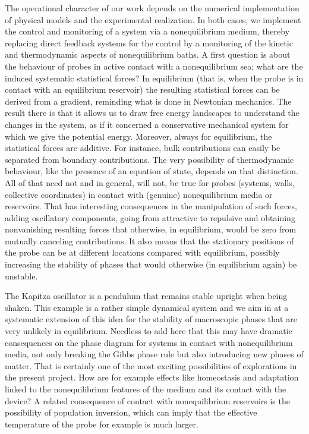 The operational character of our work depends on the numerical implementation of physical
models and the experimental realization. In both cases, we implement the control and
monitoring of a system via a nonequilibrium medium, thereby replacing direct feedback
systems for the control by a monitoring of the kinetic and thermodynamic aspects of
nonequilibrium baths.
%
A first question is about the behaviour of probes in active contact with a nonequilibrium
sea; what are the induced systematic statistical forces?
%
In equilibrium (that is, when the probe is in contact with an equilibrium reservoir) the
resulting statistical forces can be derived from a gradient, reminding what is done in
Newtonian mechanics.
%
The result there is that it allows us to draw free energy landscapes to understand the
changes in the system, as if it concerned a conservative mechanical system for which we give
the potential energy.
%
Moreover, always for equilibrium, the statistical forces are additive. For instance, bulk
contributions can easily be separated from boundary contributions. The very possibility of
thermodynamic behaviour, like the presence of an equation of state, depends on that
distinction.
%
All of that need not
and in general, will not, be true for probes (systems, walls, collective coordinates) in
contact with (genuine) nonequilibrium media or reservoirs. That has interesting
consequences in the manipulation of such forces, adding oscillatory components, going from
attractive to repulsive and obtaining nonvanishing resulting forces that otherwise, in
equilibrium, would be zero from mutually canceling contributions.  
%
It also means that the stationary positions of the probe can be at different locations
compared with equilibrium, possibly increasing the stability of phases that would otherwise
(in equilibrium again) be unstable.

The Kapitza oscillator is a pendulum that remains stable upright when being shaken. This
example is a rather simple dynamical system and we aim in \TheProject at a systematic
extension of this idea for the stability of macroscopic phases that are very unlikely in
equilibrium.
%
Needless to add here that this may have dramatic consequences on the
phase diagram for systems in contact with nonequilibrium media, not only breaking the Gibbs
phase rule but also introducing new phases of matter.  That is certainly one of the most
exciting possibilities of explorations in the present project. How are for example effects
like homeostasis and adaptation linked to the nonequilibrium features of the medium and its
contact with the device?  A related consequence of contact with nonequilibrium reservoirs is
the possibility of population inversion, which can imply that the effective temperature of
the probe for example is much larger.


